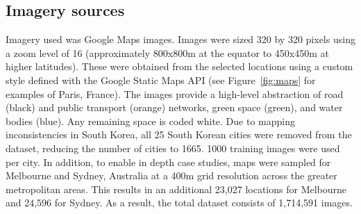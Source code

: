 \documentclass[final,3p,times,authoryear]{elsarticle}
\begin{document}
\subsection{Imagery sources}\label{methodsimagery}
Imagery used was Google Maps images. Images were sized 320 by 320 pixels using a zoom level of 16 (approximately 800x800m at the equator to 450x450m at higher latitudes). These were obtained from the selected locations using a custom style defined with the Google Static Maps API \citep{GoogleStatic2017} (see Figure~\ref{fig:maps} for examples of Paris, France). The images provide a high-level abstraction of road (black) and public transport (orange) networks, green space (green), and water bodies (blue). Any remaining space is coded white. Due to mapping inconsistencies in South Korea, all 25 South Korean cities were removed from the dataset, reducing the number of cities to 1665. 1000 training images were used per city. In addition, to enable in depth case studies, maps were sampled for Melbourne and Sydney, Australia at a 400m grid resolution across the greater metropolitan areas. This results in an additional 23,027 locations for Melbourne and 24,596 for Sydney. As a result, the total dataset consists of 1,714,591 images.
\end{document}
